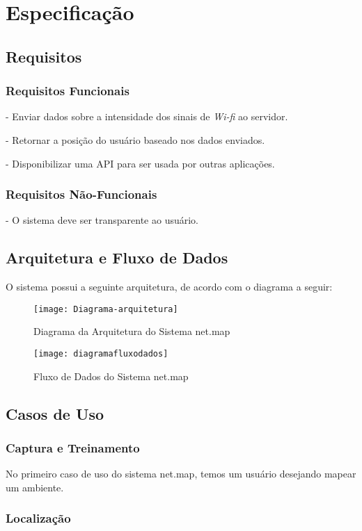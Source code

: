 
\chapter{Especificação}\label{chp:espec}
\section{Requisitos}\label{sec:req}

\subsection{Requisitos Funcionais}
- Enviar dados sobre a intensidade dos sinais de \textit{Wi-fi} ao servidor. \par
- Retornar a posição do usuário baseado nos dados enviados.\par
- Disponibilizar uma API para ser usada por outras aplicações.\par


\subsection{Requisitos Não-Funcionais}

- O sistema deve ser transparente ao usuário.\par


\section{Arquitetura e Fluxo de Dados}


O sistema possui a seguinte arquitetura, de acordo com o diagrama a seguir:


\begin{figure}[H]
	\centering
	\caption{Diagrama da Arquitetura do Sistema net.map}
  \texttt{[image: Diagrama-arquitetura]}
\label{fig:diagramaarq}

\end{figure}



\begin{figure}[H]
	\centering
	\caption{Fluxo de Dados do Sistema net.map}
  \texttt{[image: diagramafluxodados]}
\label{fig:diagramafluxo}

\end{figure}


\section{Casos de Uso}

\subsection{Captura e Treinamento}

No primeiro caso de uso do sistema net.map, temos um usuário desejando mapear um ambiente. 


\subsection{Localização}